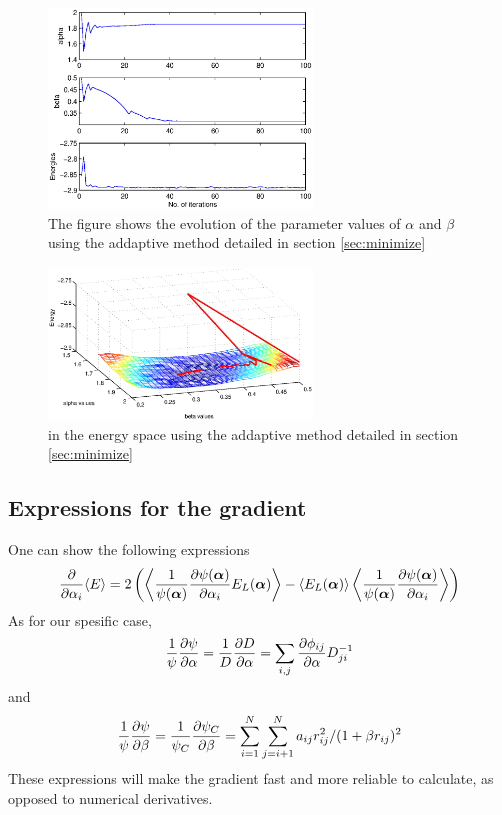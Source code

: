 \documentclass[aps,prc,twocolumn,floatfix]{revtex4}
\def\alphavec{\boldsymbol\alpha}
\begin{document}
  \begin{figure}
\centering
\includegraphics[width=7cm]{figures/addaptiveplot1.eps}
\caption{\label{fig:addap1} The figure shows the evolution of the parameter values of $\alpha$ and $\beta$ using the addaptive method detailed in section \ref{sec:minimize}}
\end{figure}

 \begin{figure}
\centering
\includegraphics[width=7cm]{figures/addaptiveplot2.eps}
\caption{in the energy space using the addaptive method detailed in section \ref{sec:minimize}}
\end{figure}
 
 \subsection{Expressions for the gradient}
 One can show the following expressions
 \begin{equation}
  {\partial  \over \partial \alpha_i}\langle E \rangle = 2\left(  \left\langle {1 \over \psi(\alphavec)} {\partial \psi(\alphavec) \over \partial \alpha_i}  E_L(\alphavec) \right\rangle - \left\langle E_L(\alphavec) \right\rangle \left\langle {1 \over \psi(\alphavec)} {\partial \psi(\alphavec) \over \partial \alpha_i} \right\rangle \right)
 \end{equation}
As for our spesific case, 
\begin{equation}
 {1\over \psi}{\partial \psi \over \partial \alpha} = {1\over D}{\partial D \over \partial \alpha} = \sum_{i,j} {\partial \phi_{ij} \over \partial \alpha} D_{ji}^{-1}
\end{equation}
and 
\begin{equation}
 {1 \over \psi} {\partial \psi \over \partial \beta} = {1 \over \psi_C} {\partial \psi_C \over \partial \beta} = \sum_{i=1}^N \sum_{j=i+1}^N a_{ij}r_{ij}^2/(1+\beta r_{ij})^2
 \end{equation}
These expressions will make the gradient fast and more reliable to calculate, as opposed to numerical derivatives. 
\end{document}

